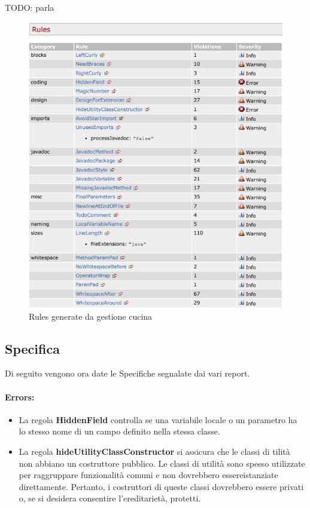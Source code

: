 TODO: parla
\begin{figure}[htbp]
	\centering
	\includegraphics[scale=1.0]{iterazione1/images/Cs_rules_Gestione_Cucina.jpg}
	\caption{Rules generate da gestione cucina\label{fig:Cs_Rules_Gestione_Cucina}}
\end{figure}


\newpage

\subsection{Specifica}
Di seguito vengono ora date le Specifiche segnalate dai vari report.

\paragraph{Errors:}

	\begin{itemize}

		\item La regola \textbf{\textbf{HiddenField}} controlla se una variabile locale o un parametro ha lo stesso nome di un campo  definito nella stessa classe.

		\item La regola \textbf{\textbf{hideUtilityClassConstructor}} si assicura che le classi di tilità non abbiano un costruttore pubblico. Le classi di utilità sono spesso utilizzate per raggruppare funzionalità comuni e non dovrebbero essereistanziate direttamente. Pertanto, i costruttori di queste classi dovrebbero essere privati o, se si desidera consentire l’ereditarietà, protetti.

	\end{itemize}

